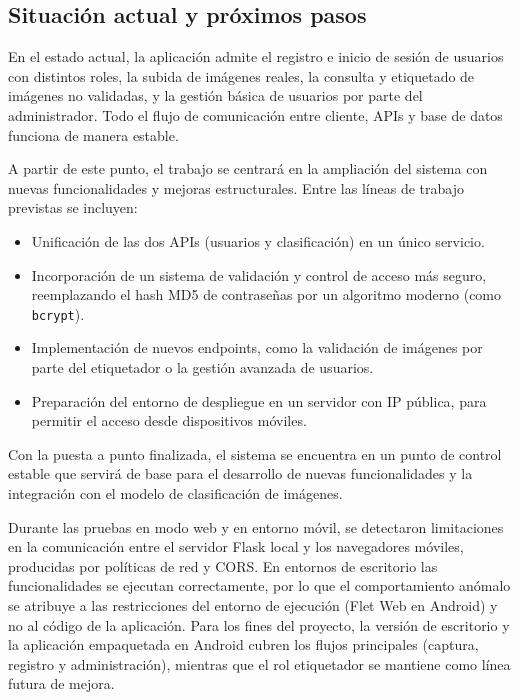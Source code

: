 \documentclass[12pt,a4paper]{article}
\begin{document}
\subsection{Situación actual y próximos pasos}

En el estado actual, la aplicación admite el registro e inicio de sesión de usuarios con distintos roles, la subida de imágenes reales, la consulta y etiquetado de imágenes no validadas, y la gestión básica de usuarios por parte del administrador. Todo el flujo de comunicación entre cliente, APIs y base de datos funciona de manera estable.

A partir de este punto, el trabajo se centrará en la ampliación del sistema con nuevas funcionalidades y mejoras estructurales. Entre las líneas de trabajo previstas se incluyen:

\begin{itemize}
    \item Unificación de las dos APIs (usuarios y clasificación) en un único servicio.
    \item Incorporación de un sistema de validación y control de acceso más seguro, reemplazando el hash MD5 de contraseñas por un algoritmo moderno (como \texttt{bcrypt}).
    \item Implementación de nuevos endpoints, como la validación de imágenes por parte del etiquetador o la gestión avanzada de usuarios.
    \item Preparación del entorno de despliegue en un servidor con IP pública, para permitir el acceso desde dispositivos móviles.
\end{itemize}

Con la puesta a punto finalizada, el sistema se encuentra en un punto de control estable que servirá de base para el desarrollo de nuevas funcionalidades y la integración con el modelo de clasificación de imágenes.

Durante las pruebas en modo web y en entorno móvil, se detectaron limitaciones en la comunicación entre el servidor Flask local y los navegadores móviles, producidas por políticas de red y CORS.
En entornos de escritorio las funcionalidades se ejecutan correctamente, por lo que el comportamiento anómalo se atribuye a las restricciones del entorno de ejecución (Flet Web en Android) y no al código de la aplicación.
Para los fines del proyecto, la versión de escritorio y la aplicación empaquetada en Android cubren los flujos principales (captura, registro y administración), mientras que el rol etiquetador se mantiene como línea futura de mejora.
\end{document}
